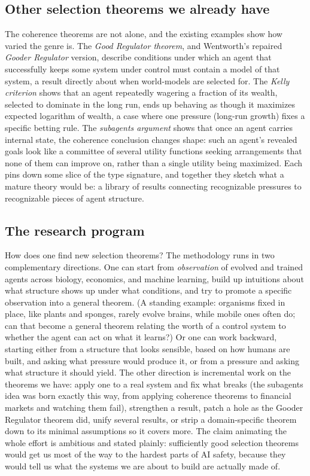 \documentclass[10pt]{article}
\theoremstyle{definition}
\theoremstyle{remark}
\begin{document}
\subsection{Other selection theorems we already have}

The coherence theorems are not alone, and the existing examples show how varied the genre is. The \emph{Good Regulator theorem}, and Wentworth's repaired \emph{Gooder Regulator} version, describe conditions under which an agent that successfully keeps some system under control must contain a model of that system, a result directly about when world-models are selected for. The \emph{Kelly criterion} shows that an agent repeatedly wagering a fraction of its wealth, selected to dominate in the long run, ends up behaving as though it maximizes expected logarithm of wealth, a case where one pressure (long-run growth) fixes a specific betting rule. The \emph{subagents argument} shows that once an agent carries internal state, the coherence conclusion changes shape: such an agent's revealed goals look like a committee of several utility functions seeking arrangements that none of them can improve on, rather than a single utility being maximized. Each pins down some slice of the type signature, and together they sketch what a mature theory would be: a library of results connecting recognizable pressures to recognizable pieces of agent structure.

\subsection{The research program}

How does one find new selection theorems? The methodology runs in two complementary directions. One can start from \emph{observation} of evolved and trained agents across biology, economics, and machine learning, build up intuitions about what structure shows up under what conditions, and try to promote a specific observation into a general theorem. (A standing example: organisms fixed in place, like plants and sponges, rarely evolve brains, while mobile ones often do; can that become a general theorem relating the worth of a control system to whether the agent can act on what it learns?) Or one can work backward, starting either from a structure that looks sensible, based on how humans are built, and asking what pressure would produce it, or from a pressure and asking what structure it should yield. The other direction is incremental work on the theorems we have: apply one to a real system and fix what breaks (the subagents idea was born exactly this way, from applying coherence theorems to financial markets and watching them fail), strengthen a result, patch a hole as the Gooder Regulator theorem did, unify several results, or strip a domain-specific theorem down to its minimal assumptions so it covers more. The claim animating the whole effort is ambitious and stated plainly: sufficiently good selection theorems would get us most of the way to the hardest parts of AI safety, because they would tell us what the systems we are about to build are actually made of.
\end{document}
